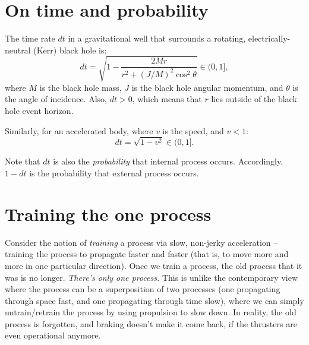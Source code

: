\documentclass[12pt]{article}
\begin{document}
\section{On time and probability}

The time rate $dt$ in a gravitational well that surrounds a rotating, electrically-neutral (Kerr) black hole \cite{mtw} is:
\begin{equation}
dt = \sqrt{1 - \frac{2Mr}{r^2 + (J/M)^2 \cos^2 \theta}} \in (0, 1] ,
\end{equation}
where $M$ is the black hole mass, $J$ is the black hole angular momentum, and $\theta$ is the angle of incidence.
Also, $dt > 0$, which means that $r$ lies outside of the black hole event horizon.

Similarly, for an accelerated body, where $v$ is the speed, and $v < 1$:
\begin{equation}
dt = \sqrt{1 - {v^2}}  \in (0, 1].
\end{equation}

Note that $dt$ is also the \textit{probability} that internal process occurs.
Accordingly, $1 - dt$ is the probability that external process occurs.





\section{Training the one process}
Consider the notion of \textit{training} a process via slow, non-jerky acceleration -- training the process to propagate faster and faster (that is, to move more and more in one particular direction).
Once we train a process, the old process that it was is no longer.
\textit{There's only one process.}
This is unlike the contemporary view where the process can be a superposition of two processes (one propagating through space fast, and one propagating through time slow), where we can simply untrain/retrain the process by using propulsion to slow down.
In reality, the old process is forgotten, and braking doesn't make it come back, if the thrusters are even operational anymore.
\end{document}
